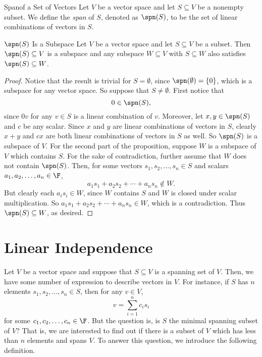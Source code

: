\documentclass[linearalgebra]{subfiles}
\begin{document}
    \begin{definition}{Span}{of a Set of Vectors}
        Let $V$ be a vector space and let $S\subseteq V$ be a nonempty subset. We define the \emph{span} of $S$, denoted as $\spn(S)$, to be the set of linear combinations of vectors in $S$.
    \end{definition}

    \clearpage
    \begin{prop}{$\spn(S)$ Is a Subspace}
        Let $V$ be a vector space and let $S\subseteq V$ be a subset. Then $\spn(S)\subseteq V$ is a subspace and any subspace $W\subseteq V$ with $S\subseteq W$ also satisfies $\spn(S)\subseteq W$.
    \end{prop}

    \begin{proof}
        Notice that the result is trivial for $S=\emptyset$, since $\spn(\emptyset) = \lbrace 0 \rbrace$, which is a subspace for any vector space. So suppose that $S\neq \emptyset$. First notice that
       \begin{equation*}
           0\in \spn(S), 
       \end{equation*}
       since $0v$ for any $v\in S$ is a linear combination of $v$. Moreover, let $x,y\in \spn(S)$ and $c$ be any scalar. Since $x$ and $y$ are linear combinations of vectors in $S$, clearly $x+y$ and $cx$ are both linear combinations of vectors in $S$ as well. So $\spn(S)$ is a subspace of $V$. For the second part of the proposition, suppose $W$ is a subspace of $V$ which contains $S$. For the sake of contradiction, further assume that $W$ does not contain $\spn(S)$. Then,
       for some vectors $s_1, s_2, \ldots, s_n\in S$ and scalars $a_1, a_2, \ldots, a_n\in \F$,
       \begin{equation*}
           a_1s_1 + a_2s_2 + \cdots + a_ns_n \notin W.
       \end{equation*}
       But clearly each $a_is_i\in W$, since $W$ contains $S$ and $W$ is closed under scalar multiplication. So $a_1s_1 + a_2s_2 + \cdots + a_ns_n\in W$, which is a contradiction. Thus $\spn(S)\subseteq W$, as desired.
    \end{proof}
    
    \section{Linear Independence}

    \begin{remark}
        Let $V$ be a vector space and suppose that $S\subseteq V$ is a spanning set of $V$. Then, we have some number of expression to describe vectors in $V$. For instance, if $S$ has $n$ elements $s_1, s_2, \ldots, s_n\in S$, then for any $v\in V$, 
        \begin{equation*}
            v = \sum^{n}_{i=1} c_is_i
        \end{equation*}
        for some $c_1,c_2,\ldots,c_n\in\F$. But the question is, is $S$ the minimal spanning subset of $V$? That is, we are interested to find out if there is a subset of $V$ which has less than $n$ elements and spans $V$. To answer this question, we introduce the following definition.
    \end{remark}
\end{document}
